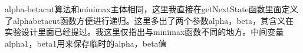 \documentclass{report}
\begin{document}
    \begin{figure}[ht]
        \centering
    \end{figure}
    alpha-betacut算法和minimax主体相同，这里我直接在getNextState函数里面定义了alphabetacut函数方便进行递归。这里多出了两个参数alpha，beta，其含义在
    实验设计里面已经提过。我这里仅指出与minimax函数不同的地方。中间变量alpha1，beta1用来保存临时的alpha，beta值
\end{document}
